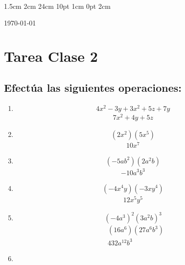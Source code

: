 \documentclass[12pt,letterpaper]{report}
\begin{document}
\setmargins{2.5cm}      
{1.5cm}                     
{2cm}  
{24cm}                    
{10pt}                          
{1cm}                          
{0pt}                             
{2cm}
\begin{flushright}
\today
\end{flushright}
\vspace{-1.75cm}
\section*{Tarea Clase 2}
\subsection*{Efectúa las siguientes operaciones:}
\begin{enumerate}
    \item \begin{equation*}
        4x^2-3y+3x^2+5z+7y
    \end{equation*}
    \begin{align*}
        7x^2+4y+5z
    \end{align*}
    \item \begin{equation*}
    (2x^2)(5x^5)    
    \end{equation*}
    \begin{align*}
        10x^7
    \end{align*}
    \item \begin{equation*}
        (-5ab^2)(2a^2b)
    \end{equation*}
    \begin{align*}
        -10a^3b^3
    \end{align*}
    \item \begin{equation*}
        (-4x^4y)(-3xy^4)
    \end{equation*}
    \begin{align*}
        12x^5y^5
    \end{align*}
    \item \begin{equation*}
        (-4a^3)^2(3a^2b)^3
    \end{equation*}
    \begin{align*}
        &(16a^6)(27a^6b^3)\\
        &432a^12b^3
    \end{align*}
    \item \begin{equation*}

\end{equation*}
\end{enumerate}
\end{document}
